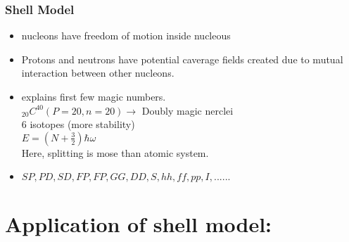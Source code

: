 \subsubsection{Shell Model}
\begin{itemize}
	\item  nucleons have freedom of motion inside nucleous \\
	\item Protons and neutrons have potential caverage fields created due to mutual interaction between other nucleons.
	\item explains first few magic numbers.\\
	${ }_{20} C^{40}(P=20, n=20) \rightarrow$ Doubly magic nerclei\\
	6 isotopes (more stability)\\
	$E=\left(N+\frac{3}{2}\right) \hbar \omega$\\
	Here, splitting is mose than atomic system.
	\item $S P, P D, S D, F P, F P, G G, D D, S, h h, f f, p p, I,......$
\end{itemize}
\section{Application of shell model:}
